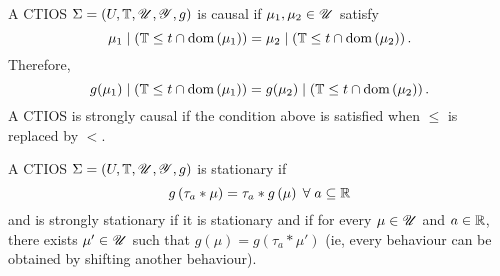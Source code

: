 \begin{definition}
	A CTIOS $\Sigma = \left( U, \mathbb{T}, \mathscr{U}, \mathscr{Y}, g \right) $ is causal if $\mu_1, \mu_2 \in \mathscr{U}$ satisfy
	 \[
		 \mu_1  \mid \left( \mathbb{T}\le t \cap \text{dom}\left(\mu_1 \right)  \right) = 		 \mu_2  \mid \left( \mathbb{T}\le t \cap \text{dom}\left(\mu_2 \right)  \right) 
	.\] 
	Therefore,
	\[
	g(\mu_1)  \mid \left( \mathbb{T}\le t \cap \text{dom}\left(\mu_1 \right)  \right) = 		 g(\mu_2) \mid \left( \mathbb{T}\le t \cap \text{dom}\left(\mu_2 \right)  \right) 
	.\] 
	A CTIOS is strongly causal if the condition above is satisfied when $\le  $ is replaced by $<$.
\end{definition}

\begin{definition}
	A CTIOS $\Sigma = \left( U, \mathbb{T}, \mathscr{U}, \mathscr{Y}, g \right) $ is stationary if 
	\[
		g\left( \tau_{a}*\mu \right) = \tau_{a}*g\left( \mu \right) \forall a \subseteq \real
	\] 
	and is strongly stationary if it is stationary and if for every $\mu \in  \mathscr{U} $ and $a \in  \mathbb{R}$, there exists $\mu' \in  \mathscr{U}$ such that $g\left( \mu \right) = g\left( \tau_{a}* \mu' \right) $ (ie, every behaviour can be obtained by shifting another behaviour).
\end{definition}
